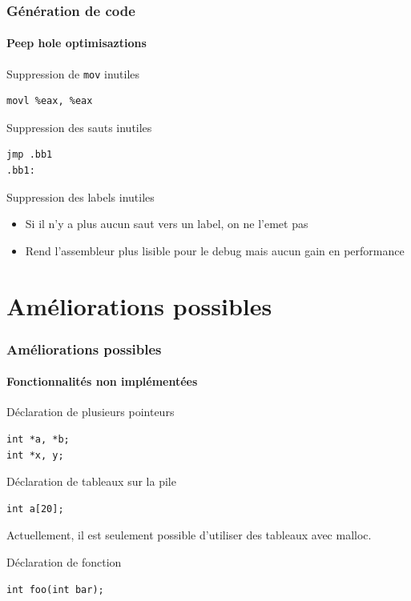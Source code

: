 \documentclass{beamer}
\begin{document}
\begin{frame}[fragile]
    \frametitle{Génération de code}
    \framesubtitle{Peep hole optimisaztions}

    \begin{block}{Suppression de \lstinline{mov} inutiles}
        \begin{lstlisting}
movl %eax, %eax
        \end{lstlisting}
    \end{block}

    \begin{block}{Suppression des sauts inutiles}
        \begin{lstlisting}
jmp .bb1
.bb1:
        \end{lstlisting}
    \end{block}

    \begin{block}{Suppression des labels inutiles}
        \begin{itemize}
            \item Si il n'y a plus aucun saut vers un label, on ne l'emet pas
            \item Rend l'assembleur plus lisible pour le debug mais aucun gain en performance
        \end{itemize}
    \end{block}
\end{frame}

\section{Améliorations possibles}

\begin{frame}[fragile]
    \frametitle{Améliorations possibles}
    \framesubtitle{Fonctionnalités non implémentées}

    \begin{block}{Déclaration de plusieurs pointeurs}
        \begin{lstlisting}
int *a, *b;
int *x, y;
        \end{lstlisting}
    \end{block}
    \pause

    \begin{block}{Déclaration de tableaux sur la pile}
        \begin{lstlisting}
int a[20];
        \end{lstlisting}
        Actuellement, il est seulement possible d'utiliser des tableaux avec malloc.
    \end{block}

    \pause
    \begin{block}{Déclaration de fonction}
        \begin{lstlisting}
int foo(int bar);
        \end{lstlisting}
    \end{block}
\end{frame}
\end{document}
